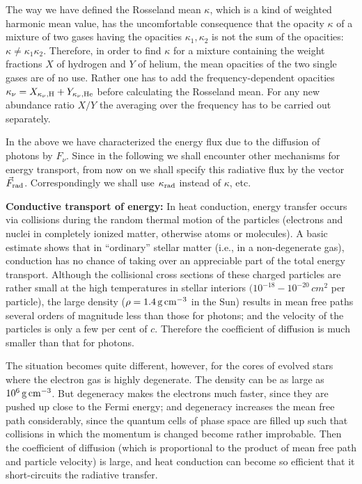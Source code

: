 \documentclass[a4paper,10pt]{article}
\begin{document}
{\noindent}The way we have defined the Rosseland mean $\kappa$, which is a kind of weighted harmonic mean value, has the uncomfortable consequence that the opacity $\kappa$ of a mixture of two gases having the opacities $\kappa_1,\kappa_2$ is not the sum of the opacities: $\kappa\neq\kappa_1\kappa_2$. Therefore, in order to find $\kappa$ for a mixture containing the weight fractions $X$ of hydrogen and $Y$ of helium, the mean opacities of the two single gases are of no use. Rather one has to add the frequency-dependent opacities $\kappa_\nu=X_{\kappa_\nu,{\rm H}}+Y_{\kappa_\nu,{\rm He}}$ before calculating the Rosseland mean. For any new abundance ratio $X/Y$ the averaging over the frequency has to be carried out separately.

{\noindent}In the above we have characterized the energy flux due to the diffusion of photons by $F_\nu$. Since in the following we shall encounter other mechanisms for energy transport, from now on we shall specify this radiative flux by the vector $\vec{F}_{\rm rad}$. Correspondingly we shall use $\kappa_{\rm rad}$ instead of  $\kappa$, etc.

{\noindent}\textbf{Conductive transport of energy:} In heat conduction, energy transfer occurs via collisions during the random thermal motion of the particles (electrons and nuclei in completely ionized matter, otherwise atoms or molecules). A basic estimate shows that in ``ordinary'' stellar matter (i.e., in a non-degenerate gas), conduction has no chance of taking over an appreciable part of the total energy transport. Although the collisional cross sections of these charged particles are rather small at the high temperatures in stellar interiors $(10^{-18}-10^{-20}\,cm^2$ per particle), the large density ($\rho=1.4\,{\rm g\,cm^{-3}}$ in the Sun) results in mean free paths several orders of magnitude less than those for photons; and the velocity of the particles is only a few per cent of $c$. Therefore the coefficient of diffusion is much smaller than that for photons.

{\noindent}The situation becomes quite different, however, for the cores of evolved stars where the electron gas is highly degenerate. The density can be as large as $10^6\,{\rm g\,cm^{-3}}$. But degeneracy makes the electrons much faster, since they are pushed up close to the Fermi energy; and degeneracy increases the mean free path considerably, since the quantum cells of phase space are filled up such that collisions in which the momentum is changed become rather improbable. Then the coefficient of diffusion (which is proportional to the product of mean free path and particle velocity) is large, and heat conduction can become so efficient that it short-circuits the radiative transfer.
\end{document}
